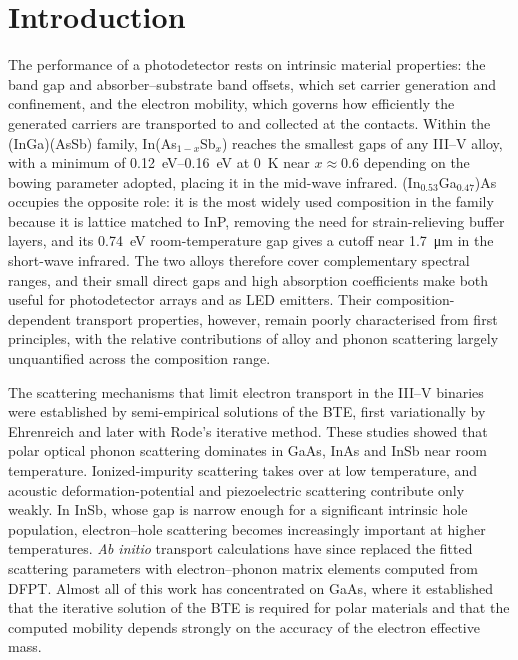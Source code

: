 \documentclass[aps,prmaterials,reprint,amsmath,amssymb,superscriptaddress]{revtex4-2}
\begin{document}
\section{Introduction}

The performance of a photodetector rests on intrinsic material properties: the band gap and absorber--substrate band offsets, which set carrier generation and confinement\cite{Hao2023}, and the electron mobility, which governs how efficiently the generated carriers are transported to and collected at the contacts\cite{intro_efficienty_Pecunia2019}. Within the (InGa)(AsSb) family, In(As$_{1-x}$Sb$_x$) reaches the smallest gaps of any III--V alloy, with a minimum of \SIrange{0.12}{0.16}{\electronvolt} at \SI{0}{\kelvin} near $x\approx0.6$ depending on the bowing parameter adopted\cite{Cripps2008,Murawski2019}, placing it in the mid-wave infrared. (In$_{0.53}$Ga$_{0.47}$)As occupies the opposite role: it is the most widely used composition in the family\cite{Forrest1980,Zhang2018} because it is lattice matched to InP\cite{Donati2003}, removing the need for strain-relieving buffer layers, and its \SI{0.74}{\electronvolt} room-temperature gap gives a cutoff near \SI{1.7}{\micro\meter} in the short-wave infrared. The two alloys therefore cover complementary spectral ranges, and their small direct gaps and high absorption coefficients make both useful for photodetector arrays\cite{InAsSbPD1_Rogalski2020} and as LED emitters\cite{InGaAsLED1_Yang2020,InAsSbLED1_Mynbaev2017,InGaAsLED2_Grasse2013}. Their composition-dependent transport properties, however, remain poorly characterised from first principles, with the relative contributions of alloy and phonon scattering largely unquantified across the composition range.

The scattering mechanisms that limit electron transport in the III--V binaries were established by semi-empirical solutions of the BTE, first variationally by Ehrenreich\cite{Ehrenreich1957,Ehrenreich1960} and later with Rode's iterative method\cite{Rode1971,Rode1975}. These studies showed that polar optical phonon scattering dominates in GaAs, InAs and InSb near room temperature. Ionized-impurity scattering takes over at low temperature, and acoustic deformation-potential and piezoelectric scattering contribute only weakly. In InSb, whose gap is narrow enough for a significant intrinsic hole population, electron--hole scattering becomes increasingly important at higher temperatures\cite{InSb_mobility_Jung1991}. \textit{Ab initio} transport calculations have since replaced the fitted scattering parameters with electron--phonon matrix elements computed from DFPT. Almost all of this work has concentrated on GaAs\cite{Perturbo1,Liu2017,Ma2018,Brunin2020,Lee2020}, where it established that the iterative solution of the BTE is required for polar materials and that the computed mobility depends strongly on the accuracy of the electron effective mass\cite{Ma2018,Ponce2018}. 
\end{document}
